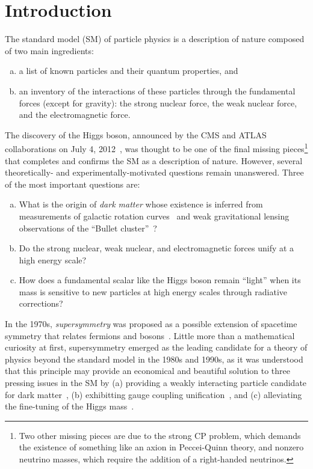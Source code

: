 \chapter{Introduction}
\label{ch:intro}

The standard model (SM) of particle physics is a description of nature
composed of two main ingredients:
\begin{enumerate}[(a)]
\item a list of known particles and their quantum properties, and
\item an inventory of the interactions of these particles through the fundamental forces
(except for gravity): the strong nuclear force, the weak nuclear force, and the electromagnetic
force. 
\end{enumerate}
The discovery of the Higgs boson, announced by the CMS and ATLAS
collaborations on July 4, 2012~\cite{CMShiggs,ATLAShiggs}, was
thought to be one of the final missing pieces\footnote{Two other missing
  pieces are due to the strong CP problem, which demands the existence of
  something like an axion in Peccei-Quinn theory, and nonzero neutrino masses, which require the addition of a right-handed neutrinos.} that completes and confirms the
SM as a description of nature. However, several theoretically- and
experimentally-motivated questions remain unanswered. Three
of the most important questions are:
\begin{enumerate}[(a)]
\item What is the origin of \emph{dark matter} whose existence is
  inferred from measurements of galactic rotation curves~\cite{1980ApJrotationcurves,1989HIrotationcurves} and weak gravitational lensing
  observations of the ``Bullet cluster''~\cite{Clowe:2006eq}?
\item Do the strong nuclear, weak nuclear, and electromagnetic
  forces unify at a high energy scale?
\item How does a fundamental scalar like the Higgs boson remain
  ``light'' when its mass is sensitive to new particles at high energy
  scales through radiative corrections?
\end{enumerate}

In the 1970s, \emph{supersymmetry} was proposed as a
possible extension of spacetime symmetry that relates fermions and
bosons~\cite{Ramond,Golfand,Volkov,Wess,Fayet}. Little
more than a mathematical curiosity at first, supersymmetry
emerged as the leading candidate for a theory of physics beyond the
standard model in the 1980s and 1990s, as it was understood that this 
principle may provide an economical and beautiful solution to
three pressing issues in the SM by (a) providing a weakly interacting particle candidate for dark
matter~\cite{Ellis:1983ew,Jungman:1995df}, (b) exhibitting gauge coupling
unification~\cite{Dimopoulos:1981yj,Marciano:1981un,Einhorn:1981sx,Ibanez:1981yh,Amaldi:1991cn,Langacker:1995fk},
and (c) alleviating the fine-tuning of the Higgs mass~\cite{Witten:1981nf,Dimopoulos:1981zb,Dine:1981za,Dimopoulos:1981au,Sakai:1981gr,Kaul:1981hi}.

